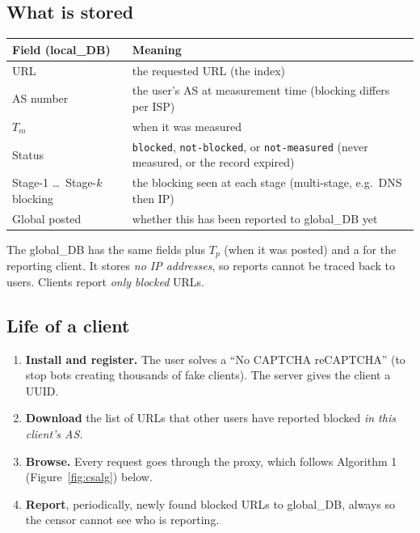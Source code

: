 \subsection{What is stored}
\begin{center}
\small
\begin{tabularx}{\linewidth}{@{}lX@{}}
\toprule
Field (local\_DB) & Meaning\\
\midrule
URL & the requested URL (the index)\\
AS number & the user's AS at measurement time (blocking differs per ISP)\\
$T_m$ & when it was measured\\
Status & \texttt{blocked}, \texttt{not-blocked}, or \texttt{not-measured} (never measured, or the record expired)\\
Stage-1 \dots\ Stage-$k$ blocking & the blocking seen at each stage (multi-stage, e.g.\ DNS then IP)\\
Global posted & whether this has been reported to global\_DB yet\\
\bottomrule
\end{tabularx}
\end{center}
The global\_DB has the same fields plus $T_p$ (when it was posted) and a  for the reporting client. It stores \emph{no IP
addresses}, so reports cannot be traced back to users. Clients report \emph{only blocked} URLs.

\subsection{Life of a client}
\begin{enumerate}
  \item \textbf{Install and register.} The user solves a ``No CAPTCHA reCAPTCHA'' (to stop bots creating thousands of fake clients). The
        server gives the client a UUID.
  \item \textbf{Download} the list of URLs that other users have reported blocked \emph{in this client's AS}.
  \item \textbf{Browse.} Every request goes through the proxy, which follows Algorithm 1 (Figure~\ref{fig:csalg}) below.
  \item \textbf{Report}, periodically, newly found blocked URLs to global\_DB, always  so the censor cannot see who is reporting.
\end{enumerate}

